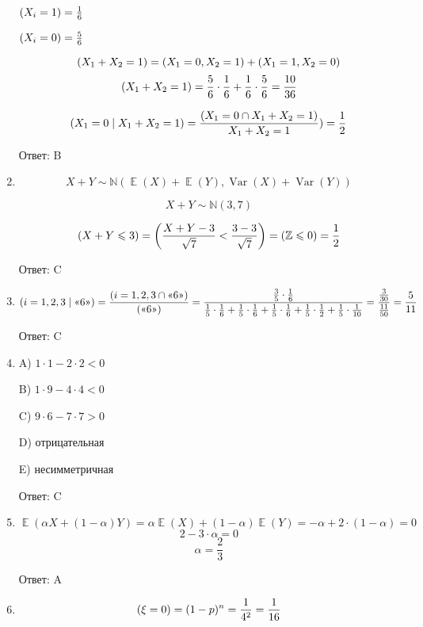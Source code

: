 \documentclass[a4paper,12pt]{article} %
\DeclareMathOperator{\Var}{Var}
\DeclareMathOperator{\E}{\mathbb{E}}
\let\P\relax
\DeclareMathOperator{\P}{\mathbb{P}}
\newcommand \N{\mathbb{N}}
\newcommand \Z{\mathbb{Z}}
\renewcommand{\leq}{\leqslant}
\begin{document}
\begin{enumerate}
    $\P(X_{i} = 1) = \frac{1}{6}$

    $\P(X_{i} = 0) = \frac{5}{6}$

    \[\P(X_{1} + X_{2} = 1) = \P(X_{1} = 0, X_{2} = 1) + \P(X_{1} = 1, X_{2} = 0) \]
    \[\P(X_{1} + X_{2} = 1) = \frac{5}{6} \cdot \frac{1}{6} + \frac{1}{6} \cdot \frac{5}{6} = \frac{10}{36}\]
    
    \[\P(X_{1} = 0\mid X_{1} + X_{2} = 1) = \frac{\P(X_{1} = 0\cap X_{1} + X_{2} = 1)}{X_{1} + X_{2} = 1}) = \frac{1}{2}\]
    
    Ответ: B

    \item

    \[X + Y \sim \N(\E(X) + \E(Y), \Var(X) + \Var(Y))\]

    \[X + Y \sim \N(3,7)\]

    \[\P(X + Y\leq 3) = \P\left(\frac{X+Y-3}{\sqrt{7}} < \frac{3-3}{\sqrt{7}}\right) = (\Z\leq 0) = \frac{1}{2}\]

    Ответ: C

    \item

    \[\P(i=1,2,3\mid \text{<<6>>}) = \frac{\P(i=1,2,3\cap \text{<<6>>})}{\P(\text{<<6>>})} = \frac{\frac{3}{5}\cdot \frac{1}{6}}{\frac{1}{5}\cdot \frac{1}{6} + \frac{1}{5}\cdot \frac{1}{6} + \frac{1}{5}\cdot \frac{1}{6} + \frac{1}{5}\cdot \frac{1}{2} + \frac{1}{5}\cdot \frac{1}{10}} = \frac{\frac{3}{30}}{\frac{11}{50}} = \frac{5}{11} \]

    Ответ: C

    \item

    A) $1\cdot1 - 2\cdot2 < 0$

    B) $1\cdot9 - 4\cdot4 < 0$

    C) $9\cdot6 - 7\cdot7 > 0$
    
    D) отрицательная
    
    E) несимметричная

    Ответ: C

    \item

    \[\E(\alpha X + (1 - \alpha)Y) = \alpha \E(X) + (1-\alpha) \E(Y) = -\alpha + 2\cdot(1-\alpha) = 0\]
    \[2 - 3\cdot\alpha = 0\]
    \[\alpha = \frac{2}{3}\]

    Ответ: A

    \item

    \[\P(\xi = 0) = (1-p)^n = \frac{1}{4^2} = \frac{1}{16}\]


\end{enumerate}
\end{document}
